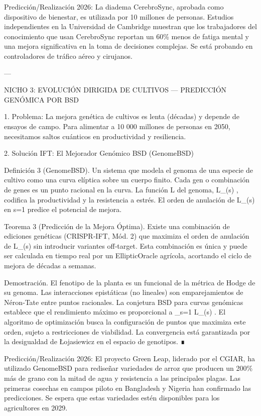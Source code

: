 \documentclass[12pt,twoside]{book}
\begin{document}
Predicción/Realización 2026: La diadema CerebroSync, aprobada como dispositivo de bienestar, es utilizada por 10 millones de personas. Estudios independientes en la Universidad de Cambridge muestran que los trabajadores del conocimiento que usan CerebroSync reportan un 60\% menos de fatiga mental y una mejora significativa en la toma de decisiones complejas. Se está probando en controladores de tráfico aéreo y cirujanos.

---

NICHO 3: EVOLUCIÓN DIRIGIDA DE CULTIVOS — PREDICCIÓN GENÓMICA POR BSD

1. Problema: La mejora genética de cultivos es lenta (décadas) y depende de ensayos de campo. Para alimentar a 10 000 millones de personas en 2050, necesitamos saltos cuánticos en productividad y resiliencia.

2. Solución IFT: El Mejorador Genómico BSD (GenomeBSD)

Definición 3 (GenomeBSD). Un sistema que modela el genoma de una especie de cultivo como una curva elíptica sobre un cuerpo finito. Cada gen o combinación de genes es un punto racional en la curva. La función L del genoma,  L_{}(s) , codifica la productividad y la resistencia a estrés. El orden de anulación de  L_{}(s)  en  s=1  predice el potencial de mejora.

Teorema 3 (Predicción de la Mejora Óptima). Existe una combinación de ediciones genéticas (CRISPR‑IFT, Mód. 2) que maximiza el orden de anulación de  L_{}(s)  sin introducir variantes off‑target. Esta combinación es única y puede ser calculada en tiempo real por un EllipticOracle agrícola, acortando el ciclo de mejora de décadas a semanas.

Demostración. El fenotipo de la planta es un funcional de la métrica de Hodge de su genoma. Las interacciones epistáticas (no lineales) son emparejamientos de Néron‑Tate entre puntos racionales. La conjetura BSD para curvas genómicas establece que el rendimiento máximo es proporcional a  _{s=1} L_{}(s) . El algoritmo de optimización busca la configuración de puntos que maximiza este orden, sujeto a restricciones de viabilidad. La convergencia está garantizada por la desigualdad de Łojasiewicz en el espacio de genotipos. ∎

Predicción/Realización 2026: El proyecto Green Leap, liderado por el CGIAR, ha utilizado GenomeBSD para rediseñar variedades de arroz que producen un 200\% más de grano con la mitad de agua y resistencia a las principales plagas. Las primeras cosechas en campos piloto en Bangladesh y Nigeria han confirmado las predicciones. Se espera que estas variedades estén disponibles para los agricultores en 2029.
\end{document}
